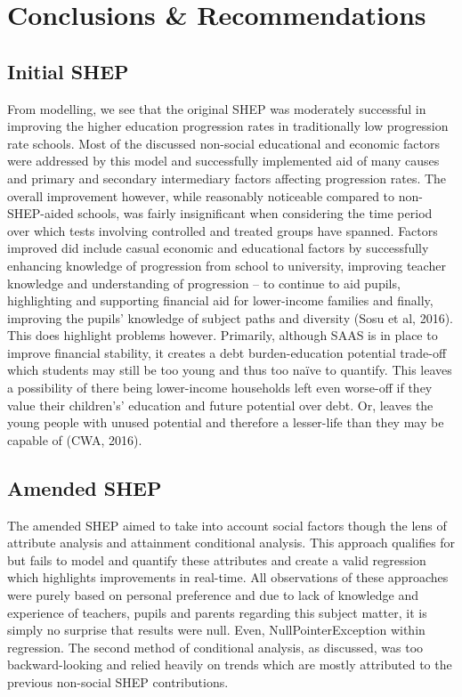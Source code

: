 \documentclass[11pt, english]{article}
\begin{document}
\newpage

\section{Conclusions \& Recommendations}

	\subsection{Initial SHEP}

	From modelling, we see that the original SHEP was moderately successful in improving the higher education progression rates in traditionally low progression rate schools. Most of the discussed non-social educational and economic factors were addressed by this model and successfully implemented aid of many causes and primary and secondary intermediary factors affecting progression rates. The overall improvement however, while reasonably noticeable compared to non-SHEP-aided schools, was fairly insignificant when considering the time period over which tests involving controlled and treated groups have spanned. Factors improved did include casual economic and educational factors by successfully enhancing knowledge of progression from school to university, improving teacher knowledge and understanding of progression – to continue to aid pupils, highlighting and supporting financial aid for lower-income families and finally, improving the pupils' knowledge of subject paths and diversity (Sosu et al, 2016).\\

	This does highlight problems however. Primarily, although SAAS is in place to improve financial stability, it creates a debt burden-education potential trade-off which students may still be too young and thus too naïve to quantify. This leaves a possibility of there being lower-income households left even worse-off if they value their children's' education and future potential over debt. Or, leaves the young people with unused potential and therefore a lesser-life than they may be capable of (CWA, 2016).

	\subsection{Amended SHEP}

	The amended SHEP aimed to take into account social factors though the lens of attribute analysis and attainment conditional analysis. This approach qualifies for but fails to model and quantify these attributes and create a valid regression which highlights improvements in real-time. All observations of these approaches were purely based on personal preference and due to lack of knowledge and experience of teachers, pupils and parents regarding this subject matter, it is simply no surprise that results were null. Even, NullPointerException within regression. The second method of conditional analysis, as discussed, was too backward-looking and relied heavily on trends which are mostly attributed to the previous non-social SHEP contributions.\\
\end{document}
